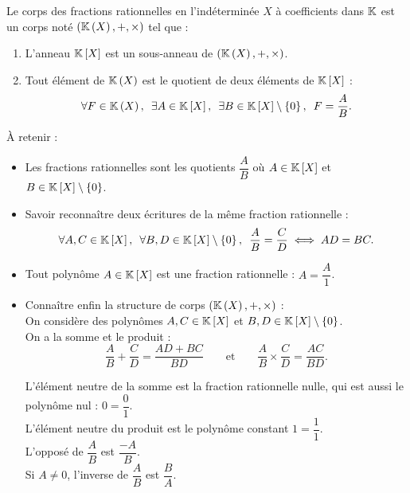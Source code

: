 \begin{defi}
Le corps des fractions rationnelles en l'indéterminée \(X\) à coefficients dans \(\mathbb{K}\) est un corps noté \(\corps{\fracrat}\) tel que :

\begin{enumerate}
\item L'anneau \(\poly\) est un sous-anneau de \(\corps{\fracrat}\). \\

\item Tout élément de \(\fracrat\) est le quotient de deux éléments de \(\poly\) : \[\quantifs{\forall F\in\fracrat;\exists A\in\poly;\exists B\in\poly\excluant\accol{0}}F=\dfrac{A}{B}.\]
\end{enumerate}

À retenir :

\begin{itemize}
\item Les fractions rationnelles sont les quotients \(\dfrac{A}{B}\) où \(A\in\poly\) et \(B\in\poly\excluant\accol{0}\). \\

\item Savoir reconnaître deux écritures de la même fraction rationnelle : \[\quantifs{\forall A,C\in\poly;\forall B,D\in\poly\excluant\accol{0}}\dfrac{A}{B}=\dfrac{C}{D}\ssi AD=BC.\]

\item Tout polynôme \(A\in\poly\) est une fraction rationnelle : \(A=\dfrac{A}{1}\). \\

\item Connaître enfin la structure de corps \(\corps{\fracrat}\) : \\

On considère des polynômes \(A,C\in\poly\) et \(B,D\in\poly\excluant\accol{0}\). \\

On a la somme et le produit : \[\dfrac{A}{B}+\dfrac{C}{D}=\dfrac{AD+BC}{BD}\qquad\text{et}\qquad\dfrac{A}{B}\times\dfrac{C}{D}=\dfrac{AC}{BD}.\]

L'élément neutre de la somme est la fraction rationnelle nulle, qui est aussi le polynôme nul : \(0=\dfrac{0}{1}\). \\

L'élément neutre du produit est le polynôme constant \(1=\dfrac{1}{1}\). \\

L'opposé de \(\dfrac{A}{B}\) est \(\dfrac{-A}{B}\). \\

Si \(A\not=0\), l'inverse de \(\dfrac{A}{B}\) est \(\dfrac{B}{A}\).
\end{itemize}
\end{defi}

